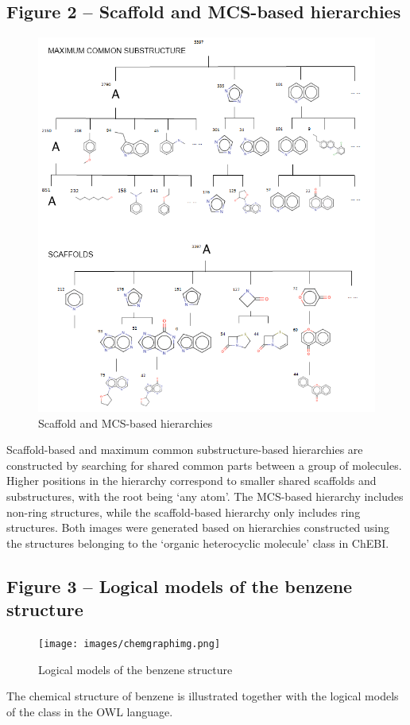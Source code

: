 \documentclass[10pt]{bmc_article}
\newenvironment{bmcformat}{\baselineskip20pt\sloppy\setboolean{publ}{false}}{\baselineskip20pt\sloppy}
\begin{document}
\begin{bmcformat}
\subsection*{Figure 2 -- Scaffold and MCS-based hierarchies}
\begin{figure}[htbp]
  \caption{Scaffold and MCS-based hierarchies}
  \label{fig:scaffolds}
  \centering
    \includegraphics[width=\textwidth]{images/scaffoldmcs.png}
\end{figure}
Scaffold-based and maximum common substructure-based hierarchies are constructed by searching for shared common parts between a group of molecules. Higher positions in the hierarchy correspond to smaller shared scaffolds and substructures, with the root being `any atom'. The MCS-based hierarchy includes non-ring structures, while the scaffold-based hierarchy only includes ring structures. Both images were generated based on hierarchies constructed using the structures belonging to the `organic heterocyclic molecule' class in ChEBI. 


\subsection*{Figure 3 -- Logical models of the benzene structure}
\begin{figure}[htbp]
  \caption{Logical models of the benzene structure}
  \label{fig:benzene}
  \centering
    \texttt{[image: images/chemgraphimg.png]}
\end{figure}
The chemical structure of benzene is illustrated together with the logical models of the class in the OWL language. 



\end{bmcformat}
\end{document}
